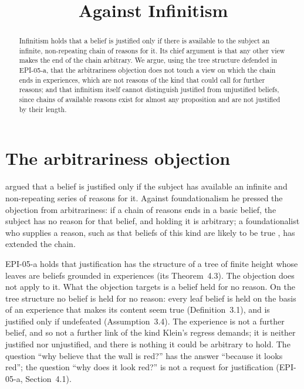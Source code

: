 \documentclass{situationist-preprint}
\title{Against Infinitism}
\begin{document}
\maketitle

\begin{abstract}
Infinitism holds that a belief is justified only if there is available to the subject an infinite, non-repeating chain of reasons for it. Its chief argument is that any other view makes the end of the chain arbitrary. We argue, using the tree structure defended in EPI-05-a, that the arbitrariness objection does not touch a view on which the chain ends in experiences, which are not reasons of the kind that could call for further reasons; and that infinitism itself cannot distinguish justified from unjustified beliefs, since chains of available reasons exist for almost any proposition and are not justified by their length.
\end{abstract}

\section{The arbitrariness objection}

\citet{Klein1999} argued that a belief is justified only if the subject has available an infinite and non-repeating series of reasons for it. Against foundationalism he pressed the objection from arbitrariness: if a chain of reasons ends in a basic belief, the subject has no reason for that belief, and holding it is arbitrary; a foundationalist who supplies a reason, such as that beliefs of this kind are likely to be true \citep{BonJour1985}, has extended the chain.

EPI-05-a holds that justification has the structure of a tree of finite height whose leaves are beliefs grounded in experiences (its Theorem~4.3). The objection does not apply to it. What the objection targets is a belief held for no reason. On the tree structure no belief is held for no reason: every leaf belief is held on the basis of an experience that makes its content seem true (Definition~3.1), and is justified only if undefeated (Assumption~3.4). The experience is not a further belief, and so not a further link of the kind Klein's regress demands; it is neither justified nor unjustified, and there is nothing it could be arbitrary to hold. The question \enquote{why believe that the wall is red?} has the answer \enquote{because it looks red}; the question \enquote{why does it look red?} is not a request for justification (EPI-05-a, Section~4.1).
\end{document}
